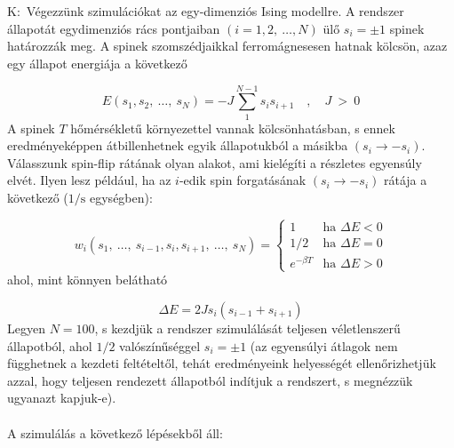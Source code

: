 \section{} \label{sec:1}
K:\ Végezzünk szimulációkat az egy-dimenziós Ising modellre. A rendszer állapotát egydimenziós rács pontjaiban $\left( i = 1, 2,\ \dots, N \right)$ ülő $s_{i} = \pm 1$ spinek határozzák meg. A spinek szomszédjaikkal ferromágnesesen hatnak kölcsön, azaz egy állapot energiája a következő

\begin{equation*}
    E \left( s_{1}, s_{2},\ \dots,\ s_{N} \right)
    =
    - J \sum_{1}^{N-1} s_{i} s_{i+1}
    \quad , \quad
    J\ >\ 0
\end{equation*}
A spinek $T$ hőmérsékletű környezettel vannak kölcsönhatásban, s ennek eredményeképpen átbillenhetnek egyik állapotukból a másikba $\left( s_{i} \to -s_{i} \right)$. \\
Válasszunk spin-flip rátának olyan alakot, ami kielégíti a részletes egyensúly elvét. Ilyen lesz például, ha az $i$-edik spin forgatásának $\left( s_{i} \to -s_{i} \right)$ rátája a következő ($1/\text{s}$ egységben):

\begin{equation*}
    w_{i} \left( s_{1},\ \dots,\ s_{i-1}, s_{i}, s_{i+1},\ \dots,\ s_{N} \right)
    =
    \begin{cases}
        1   &\text{ha } \Delta E < 0 \\
        1/2 &\text{ha } \Delta E = 0 \\
        e^{- \beta T} &\text{ha } \Delta E > 0
    \end{cases}
\end{equation*}
ahol, mint könnyen belátható

\begin{equation*}
    \Delta E
    =
    2 J s_{i} \left( s_{i-1} + s_{i+1} \right)
\end{equation*}
Legyen $N = 100$, s kezdjük a rendszer szimulálását teljesen véletlenszerű állapotból, ahol
$1/2$ valószínűséggel $s_{i} = \pm 1$ (az egyensúlyi átlagok nem függhetnek a kezdeti feltételtől, tehát
eredményeink helyességét ellenőrizhetjük azzal, hogy teljesen rendezett állapotból indítjuk a
rendszert, s megnézzük ugyanazt kapjuk-e).
\\ \\
A szimulálás a következő lépésekből áll:

